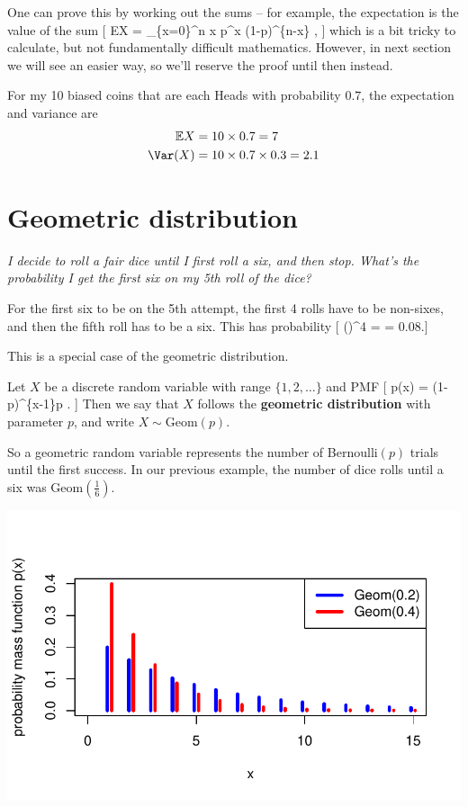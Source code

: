 \documentclass[
  letterpaper,
]{report}
\theoremstyle{definition}
\theoremstyle{definition}
\theoremstyle{remark}
\begin{document}
One can prove this by working out the sums -- for example, the
expectation is the value of the sum {[} \mathbb EX = \sum\_\{x=0\}\^{}n
x  p\^{}x (1-p)\^{}\{n-x\} , {]} which is a bit tricky to
calculate, but not fundamentally difficult mathematics. However, in next
section we will see an easier way, so we'll reserve the proof until then
instead.

For my 10 biased coins that are each Heads with probability \(0.7\), the
expectation and variance are \begin{align*}
  \mathbb EX &= 10 \times 0.7 = 7 \\
  \Var(X) &= 10 \times 0.7 \times 0.3 = 2.1
\end{align*}

\hypertarget{geometric}{%
\section{Geometric distribution}\label{geometric}}

\emph{I decide to roll a fair dice until I first roll a six, and then
stop. What's the probability I get the first six on my 5th roll of the
dice?}

For the first six to be on the 5th attempt, the first 4 rolls have to be
non-sixes, and then the fifth roll has to be a six. This has probability
{[} \left(\right)\^{}4 \times  {} =  =
0.08.{]}

This is a special case of the geometric distribution.

Let \(X\) be a discrete random variable with range \(\{1,2,\dots\}\) and
PMF {[} p(x) = (1-p)\^{}\{x-1\}p . {]} Then we say that \(X\) follows
the \textbf{geometric distribution} with parameter \(p\), and write
\(X \sim \text{Geom}(p)\).

So a geometric random variable represents the number of Bernoulli\((p)\)
trials until the first success. In our previous example, the number of
dice rolls until a six was \(\text{Geom}(\frac16)\).

\includegraphics{sections/L11-binomial-geometric_files/figure-pdf/geom-pic-1.pdf}
\end{document}
